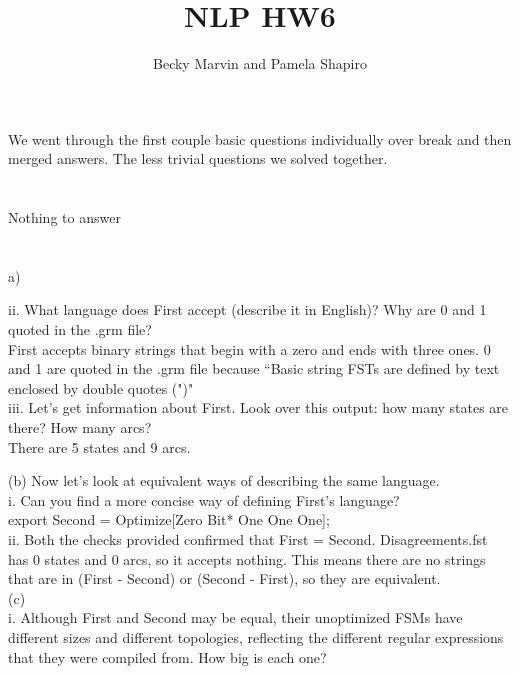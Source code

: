 \documentclass[11pt]{article} %
\title{NLP HW6}
\author{Becky Marvin and Pamela Shapiro}
\begin{document}
\maketitle

We went through the first couple basic questions individually over break and then merged answers. The less trivial questions we solved together.\\

\section{}
Nothing to answer

\section{}

a)

ii. What language does First accept (describe it in English)? Why are 0 and 1 quoted in the .grm file?\\

First accepts binary strings that begin with a zero and ends with three ones. 0 and 1 are quoted in the .grm file because ``Basic string FSTs are defined by text enclosed by double quotes (")"\\


iii. Let’s get information about First. Look over this output: how many states are there? How many arcs?\\


There are 5 states and 9 arcs.\\

\newpage

(b) Now let’s look at equivalent ways of describing the same language. \\


i. Can you find a more concise way of defining First’s language?\\


export Second = Optimize[Zero Bit* One One One];\\


ii. Both the checks provided confirmed that First = Second. Disagreements.fst has 0 states and 0 arcs, so it accepts nothing. This means there are no strings that are in (First - Second) or (Second - First), so they are equivalent.\\


(c) \\


i. Although First and Second may be equal, their unoptimized FSMs have different sizes and different topologies, reflecting the different regular expressions that they were compiled from. How big is each one? \\
\end{document}

